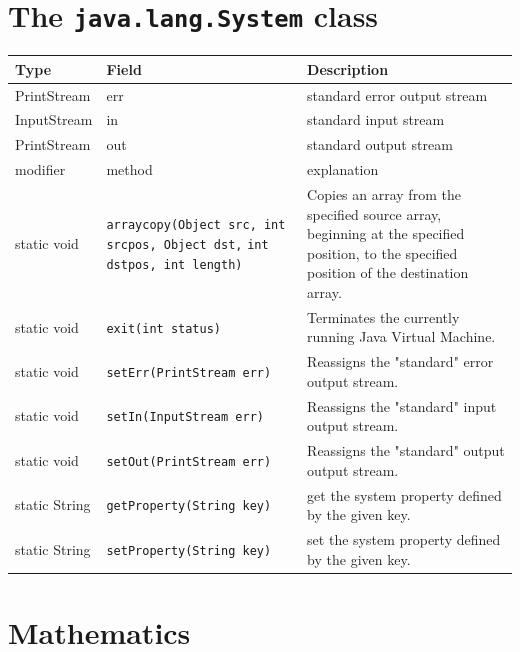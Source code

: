 \section{The \texttt{java.lang.System} class}
  \begin{center}
    \begin{tabular}{lp{5cm}p{}}
      Type & Field & Description \\\hline
      PrintStream & err & standard error output stream \\
      InputStream & in & standard input stream \\
      PrintStream & out & standard output stream \\ \hline\hline
      modifier & method & explanation \\\hline
      static void & \verb|arraycopy(Object src, int srcpos, Object dst,| 
                    \verb|int dstpos, int length)| &
         Copies an array from the specified source array, beginning at 
         the specified position, to the specified position of the
         destination array. \\
      static void & \verb|exit(int status)| & Terminates the currently 
                                     running Java Virtual Machine.\\
      static void & \verb|setErr(PrintStream err)| &  
                   Reassigns the "standard" error output stream.\\
      static void & \verb|setIn(InputStream err)| &  
                   Reassigns the "standard" input output stream.\\
      static void & \verb|setOut(PrintStream err)| &  
                   Reassigns the "standard" output output stream.\\
      static String & \verb|getProperty(String key)| & get the system property
                            defined by the given key. \\
      static String & \verb|setProperty(String key)| & set the system property
                            defined by the given key. \\
    \end{tabular}
  \end{center}

\section{Mathematics}

